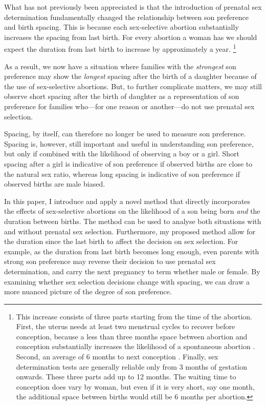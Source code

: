 \documentclass[12pt,letterpaper]{article}
\begin{document}
What has not previously been appreciated is that the introduction 
of prenatal sex determination fundamentally changed the relationship 
between son preference and birth spacing.
This is because each sex-selective abortion substantially increases the 
spacing from last birth. 
For every abortion a woman has we should expect the duration from last
birth to increase by approximately a year.%
\footnote{
This increase consists of three parts starting from the time of the 
abortion.
First, the uterus needs at least two menstrual cycles to recover 
before conception, because a less than three months space 
between abortion and conception substantially increases the likelihood 
of a spontaneous abortion \citep{zhou00b}.
Second, an average of 6 months to next conception \citep{Wang2003}.
Finally, sex determination tests are generally reliable only from 3 months 
of gestation onwards.
These three parts add up to 12 months.
The waiting time to conception does vary by woman, but even if it is very 
short, say one  month, the additional space between births would still
be 6 months per abortion.
}

As a result, we now have a situation where families with the \emph{strongest} son 
preference may show the \emph{longest} spacing after the birth of a daughter
because of the use of sex-selective abortions.
But, to further complicate matters, we may still observe short spacing 
after the birth of daughter as a representation of son preference for 
families who---for one reason or another---do not use prenatal sex selection.

Spacing, by itself, can therefore no longer be used to measure son preference. 
Spacing is, however, still important and useful in understanding son preference, 
but only if combined with the likelihood of observing a boy or a girl.
Short spacing after a girl is indicative of son preference if observed
births are close to the natural sex ratio, whereas long spacing is indicative
of son preference if observed births are male biased.

In this paper, I introduce and apply a novel method that directly incorporates 
the effects of sex-selective abortions on the likelihood of a son being born 
\emph{and} the duration between births.
The method can be used to analyse both situations with and without prenatal
sex selection.
Furthermore, my proposed method allow for the duration since the last 
birth to affect the decision on sex selection.
For example, as the duration from last birth becomes long enough, even 
parents with strong son preference may reverse their decision to use 
prenatal sex determination, and carry the next pregnancy to term whether 
male or female.
By examining whether sex selection decisions change with spacing, we can 
draw a more nuanced picture of the degree of son preference.
\end{document}
